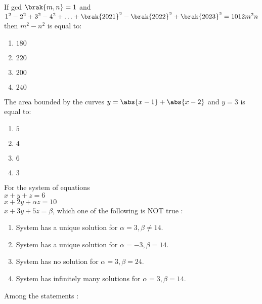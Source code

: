 \iffalse
\title{Assignment}
\author{AI24BTECH11020}
\section{mcq-single}
\fi

	\item If gcd $\brak{m, n} = 1$ and $1^2 - 2^2 + 3^2 - 4^2 + \ldots + \brak{2021}^2 - \brak{2022}^2 + \brak{2023}^2 = 1012 m^2n$ then $m^2 - n^2$ is equal to: \hfill {}
    \begin{enumerate}
        \item $180$
        \item $220$
        \item $200$
        \item $240$
    \end{enumerate}
\item The area bounded by the curves $y = \abs{ x - 1 } + \abs{ x - 2} $ and $y = 3$ is equal to: \hfill{}
    \begin{enumerate}
        \item $5$
        \item $4$
        \item $6$
        \item $3$
    \end{enumerate}                                   
\item For the system of equations \\                  
          $x+y+z=6$\\ $x+2y+ \alpha z=10 $ \\ $x+3y+5z=\beta $, which one of the following is NOT true : \hfill{}                                  
    \begin{enumerate}                                                            
        \item System has a unique solution for $\alpha =3, \beta \neq 14.$                                   \item System has a unique solution for $\alpha = -3, \beta =14.$ 
        \item System has no solution for $\alpha =3, \beta =24.$ 
        \item System has infinitely many solutions for $\alpha =3, \beta =14.$                       
    \end{enumerate}                       
\item Among the statements : \\      
